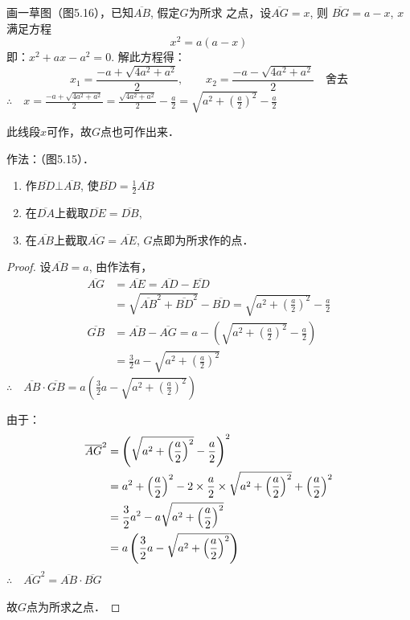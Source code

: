 \begin{analyze}
    画一草图（图5.16），已知$\overline{AB}$, 假定$G$为所求
    之点，设$\overline{AG}=x$, 则
    $\overline{BG}=a-x$,
    $x$满足方程
\[    x^2=a(a-x)\]
    即：$x^2+ax-a^2=0$. 解此方程得：
\[x_1=\frac{-a+\sqrt{4a^2+a^2}}{2},\qquad x_2=\frac{-a-\sqrt{4a^2+a^2}}{2}\quad \text{舍去}\]
$\therefore\quad x=\frac{-a+\sqrt{4a^2+a^2}}{2}=\frac{\sqrt{4a^2+a^2}}{2}-\frac{a}{2}=\sqrt{a^2+\left(\frac{a}{2}\right)^2}-\frac{a}{2}$

此线段$x$可作，故$G$点也可作出来．
\end{analyze}

作法：（图5.15）．
\begin{enumerate}
\item 作$\overline{BD}\bot\overline{AB}$, 使$\overline{BD}=\frac{1}{2}\overline{AB}$
\item 在$\overline{DA}$上截取$\overline{DE}=\overline{DB}$,\item 在$\overline{AB}$上截取$\overline{AG}=\overline{AE}$, $G$点即为所求作的点．
\end{enumerate}

\begin{proof}
    设$\overline{AB}=a$, 由作法有，
\[\begin{split}
    \overline{AG}&=\overline{AE}=\overline{AD}-\overline{ED}\\
&=\sqrt{\overline{AB}^2+\overline{BD}^2  }-\overline{BD}=\sqrt{a^2+\left(\frac{a}{2}\right)^2}-\frac{a}{2}\\
\overline{GB}&=\overline{AB}-\overline{AG}=a-\left(\sqrt{a^2+\left(\frac{a}{2}\right)^2}-\frac{a}{2}\right)\\
&=\frac{3}{2}a-\sqrt{a^2+\left(\frac{a}{2}\right)^2}
\end{split}\]
$\therefore\quad \overline{AB}\cdot \overline{GB}=a\left(\frac{3}{2}a-\sqrt{a^2+\left(\frac{a}{2}\right)^2}\right)$

由于：
\[\begin{split}
    \overline{AG}^2&=\left(\sqrt{a^2+\left(\dfrac{a}{2}\right)^2}-\dfrac{a}{2}\right)^2\\
&=a^2+\left(\dfrac{a}{2}\right)^2-2\times\dfrac{a}{2}\times \sqrt{a^2+\left(\dfrac{a}{2}\right)^2}+\left(\dfrac{a}{2}\right)^2\\
&=\dfrac{3}{2}a^2-a\sqrt{a^2+\left(\dfrac{a}{2}\right)^2}\\
&=a\left(\dfrac{3}{2}a-\sqrt{a^2+\left(\dfrac{a}{2}\right)^2}\right)
\end{split}
    \]
$\therefore\quad \overline{AG}^2=\overline{AB}\cdot \overline{BG}$

故$G$点为所求之点．
\end{proof}

